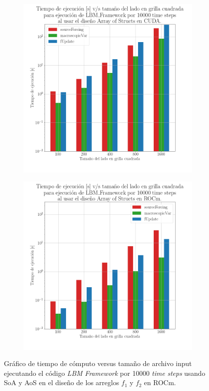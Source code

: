 \begin{figure}[H]
  \centering
  \begin{subfigure}{0.5\textwidth}
    \includegraphics[width=\linewidth]{Figures/plot7.png}
    \caption{} 
  \end{subfigure}%
  \begin{subfigure}{0.5\textwidth}
    \includegraphics[width=\linewidth]{Figures/plot9.png}
    \caption{} 
  \end{subfigure}%
  \caption{Gráfico de tiempo de cómputo versus tamaño de archivo input ejecutando el código \textit{LBM Framework} por 10000 \textit{time steps} usando SoA y AoS en el diseño de los arreglos \(f_1\) y \(f_2\) en ROCm.}
  \label{fig:19-2}
\end{figure}

